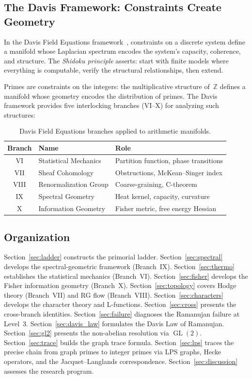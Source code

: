 \documentclass[12pt,reqno]{amsart}
\theoremstyle{plain}
\theoremstyle{definition}
\theoremstyle{remark}
\DeclareMathOperator{\GL}{GL}
\newcommand{\ZZ}{\mathbb{Z}}
\begin{document}
\subsection{The Davis Framework: Constraints Create Geometry}

In the Davis Field Equations framework~\cite{davis2024geometry},
constraints on a discrete system define a manifold whose Laplacian
spectrum encodes the system's capacity, coherence, and structure.  The
\emph{Shidoku principle} asserts: start with finite models where
everything is computable, verify the structural relationships, then
extend.

Primes are constraints on the integers: the multiplicative structure
of~$\ZZ$ defines a manifold whose geometry encodes the distribution of
primes.  The Davis framework provides five interlocking branches
(VI--X) for analyzing such structures:

\begin{table}[h]
\centering
\begin{tabular}{cll}
  \toprule
  Branch & Name & Role \\
  \midrule
  VI  & Statistical Mechanics
      & Partition function, phase transitions \\
  VII & Sheaf Cohomology
      & Obstructions, McKean--Singer index \\
  VIII & Renormalization Group
      & Coarse-graining, C-theorem \\
  IX  & Spectral Geometry
      & Heat kernel, capacity, curvature \\
  X   & Information Geometry
      & Fisher metric, free energy Hessian \\
  \bottomrule
\end{tabular}
\caption{Davis Field Equations branches applied to arithmetic manifolds.}
\label{tab:branches}
\end{table}

\subsection{Organization}

Section~\ref{sec:ladder} constructs the primorial ladder.
Section~\ref{sec:spectral} develops the spectral-geometric framework
(Branch~IX).  Section~\ref{sec:thermo} establishes the statistical
mechanics (Branch~VI).  Section~\ref{sec:fisher} develops the Fisher
information geometry (Branch~X).  Section~\ref{sec:topology} covers
Hodge theory (Branch~VII) and RG flow (Branch~VIII).
Section~\ref{sec:characters} develops the character theory and
L-functions.  Section~\ref{sec:cross} presents the cross-branch
identities.  Section~\ref{sec:failure} diagnoses the Ramanujan failure
at Level~3.  Section~\ref{sec:davis_law} formulates the Davis Law of
Ramanujan.  Section~\ref{sec:gl2} presents the non-abelian resolution
via $\GL(2)$.  Section~\ref{sec:trace} builds the graph trace formula.
Section~\ref{sec:lps} traces the precise chain from graph primes to
integer primes via LPS graphs, Hecke operators, and the
Jacquet--Langlands correspondence.
Section~\ref{sec:discussion} assesses the research program.
\end{document}
